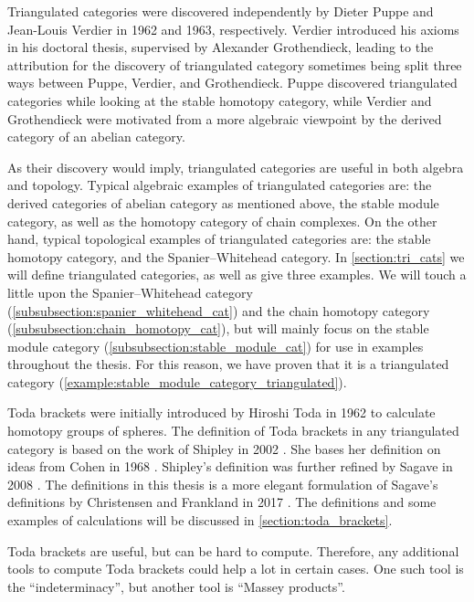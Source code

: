 Triangulated categories were discovered independently by Dieter Puppe and Jean-Louis Verdier in 1962 and 1963, respectively. Verdier introduced his axioms in his doctoral thesis, supervised by Alexander Grothendieck, leading to the attribution for the discovery of triangulated category sometimes being split three ways between Puppe, Verdier, and Grothendieck. Puppe discovered triangulated categories while looking at the stable homotopy category, while Verdier and Grothendieck were motivated from a more algebraic viewpoint by the derived category of an abelian category.

As their discovery would imply, triangulated categories are useful in both algebra and topology. Typical algebraic examples of triangulated categories are: the derived categories of abelian category as mentioned above, the stable module category, as well as the homotopy category of chain complexes. On the other hand, typical topological examples of triangulated categories are: the stable homotopy category, and the Spanier--Whitehead category. In \autoref{section:tri_cats} we will define triangulated categories, as well as give three examples. We will touch a little upon the Spanier--Whitehead category (\autoref{subsubsection:spanier_whitehead_cat}) and the chain homotopy category (\autoref{subsubsection:chain_homotopy_cat}), but will mainly focus on the stable module category (\autoref{subsubsection:stable_module_cat}) for use in examples throughout the thesis. For this reason, we have proven that it is a triangulated category (\autoref{example:stable_module_category_triangulated}).

Toda brackets were initially introduced by Hiroshi Toda in 1962 to calculate homotopy groups of spheres. The definition of Toda brackets in any triangulated category is based on the work of Shipley in 2002 \cite[Definition A.2]{Shipley_2002}. She bases her definition on ideas from Cohen in 1968 \cite[p.\ 308]{Cohen_1968}. Shipley's definition was further refined by Sagave in 2008 \cite[Remark 4.5]{Sagave_2008}. The definitions in this thesis is a more elegant formulation of Sagave's definitions by Christensen and Frankland in 2017 \cite[Definition 3.1]{Christensen-Frankland_2017}. The definitions and some examples of calculations will be discussed in \autoref{section:toda_brackets}.

Toda brackets are useful, but can be hard to compute. Therefore, any additional tools to compute Toda brackets could help a lot in certain cases. One such tool is the ``indeterminacy'', but another tool is ``Massey products''.

